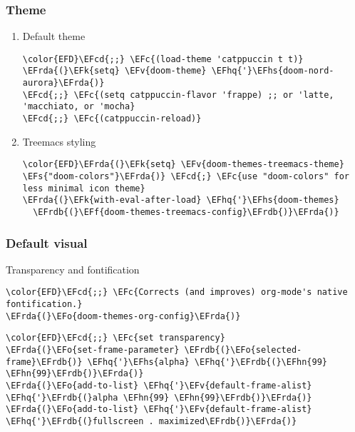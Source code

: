 \documentclass[c]{article}
\theoremstyle{plain}%
\theoremstyle{definition}
\theoremstyle{remark}
\newcommand{\EFc}[1]{\textcolor{EFc}{#1}} %
\newcommand{\EFcd}[1]{\textcolor{EFcd}{#1}} %
\newcommand{\EFs}[1]{\textcolor{EFs}{#1}} %
\newcommand{\EFk}[1]{\textcolor{EFk}{#1}} %
\newcommand{\EFf}[1]{\textcolor{EFf}{#1}} %
\newcommand{\EFv}[1]{\textcolor{EFv}{#1}} %
\newcommand{\EFo}[1]{\textcolor{EFo}{#1}} %
\newcommand{\EFhn}[1]{\textcolor{EFhn}{\textbf{#1}}} %
\newcommand{\EFhq}[1]{\textcolor{EFhq}{#1}} %
\newcommand{\EFhs}[1]{\textcolor{EFhs}{#1}} %
\newcommand{\EFrda}[1]{\textcolor{EFrda}{#1}} %
\newcommand{\EFrdb}[1]{\textcolor{EFrdb}{#1}} %
\begin{document}
\subsubsection{Theme}
\label{sec:org49b5111}
\begin{enumerate}
\item Default theme
\label{sec:org2fb6ab7}
\begin{Code}
\begin{Verbatim}
\color{EFD}\EFcd{;;} \EFc{(load-theme 'catppuccin t t)}
\EFrda{(}\EFk{setq} \EFv{doom-theme} \EFhq{'}\EFhs{doom-nord-aurora}\EFrda{)}
\EFcd{;;} \EFc{(setq catppuccin-flavor 'frappe) ;; or 'latte, 'macchiato, or 'mocha}
\EFcd{;;} \EFc{(catppuccin-reload)}
\end{Verbatim}
\end{Code}
\item Treemacs styling
\label{sec:orge27755e}
\begin{Code}
\begin{Verbatim}
\color{EFD}\EFrda{(}\EFk{setq} \EFv{doom-themes-treemacs-theme} \EFs{"doom-colors"}\EFrda{)} \EFcd{;} \EFc{use "doom-colors" for less minimal icon theme}
\EFrda{(}\EFk{with-eval-after-load} \EFhq{'}\EFhs{doom-themes}
  \EFrdb{(}\EFf{doom-themes-treemacs-config}\EFrdb{)}\EFrda{)}
\end{Verbatim}
\end{Code}
\end{enumerate}
\subsubsection{Default visual}
\label{sec:org97624e9}
Transparency and fontification
\begin{Code}
\begin{Verbatim}
\color{EFD}\EFcd{;;} \EFc{Corrects (and improves) org-mode's native fontification.}
\EFrda{(}\EFo{doom-themes-org-config}\EFrda{)}
\end{Verbatim}
\end{Code}
\begin{Code}
\begin{Verbatim}
\color{EFD}\EFcd{;;} \EFc{set transparency}
\EFrda{(}\EFo{set-frame-parameter} \EFrdb{(}\EFo{selected-frame}\EFrdb{)} \EFhq{'}\EFhs{alpha} \EFhq{'}\EFrdb{(}\EFhn{99} \EFhn{99}\EFrdb{)}\EFrda{)}
\EFrda{(}\EFo{add-to-list} \EFhq{'}\EFv{default-frame-alist} \EFhq{'}\EFrdb{(}alpha \EFhn{99} \EFhn{99}\EFrdb{)}\EFrda{)}
\EFrda{(}\EFo{add-to-list} \EFhq{'}\EFv{default-frame-alist} \EFhq{'}\EFrdb{(}fullscreen . maximized\EFrdb{)}\EFrda{)}
\end{Verbatim}
\end{Code}
\end{document}
